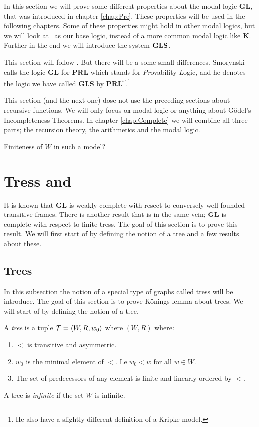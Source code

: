 \documentclass[../main.tex]{subfiles}
\begin{document}
In this section we will prove some different properties about the modal logic
\textbf{GL}, that was introduced in chapter \ref{chap:Pre}.
These properties will be used in the following chapters. Some of these properties might
hold in other modal logics, but we will look at \GL\ as our base logic,
instead of a more common modal logic like \textbf{K}.
Further in the end we will introduce the system $\text{\textbf{GLS}}$.

This section will follow \parencite{Smor1985}. But there will be a some small
differences. Smorynski calls the logic \textbf{GL} for \textbf{PRL} which
stands for \textit{Pr}ovability \textit{L}ogic, and he denotes the logic we
have called \textbf{GLS} by $\textbf{PRL}^\omega$.\footnote{He also have a
slightly different definition of a Kripke model.}

This section (and the next one) dose not use the preceding sections about recursive functions. We will only
focus on modal logic or anything about Gödel's Incompleteness Theorems. In
chapter \ref{chap:Complete} we will combine all three parts; the recursion
theory, the arithmetics and the modal logic.


Finiteness of $W$ in such a model?
\section{Tress and \GL}

It is known that \textbf{GL} is weakly complete with resect to conversely
well-founded transitive frames. There is another result that is in the same
vein; \textbf{GL} is complete with respect to finite tress. The goal of this
section is to prove this result. We will first start of by defining the notion
of a tree and a few results about these.

\subsection{Trees}
In this subsection the notion of a special type of graphs called tress will be
introduce. The goal of this section is to prove Könings lemma about trees. We
will start of by defining the notion of a tree.
\begin{defi}
	A \textit{tree} is a tuple $\mathcal{T}=\langle W,R,w_0\rangle$ where $(W,R)$ where:
	\begin{enumerate}
		\item $<$ is transitive and asymmetric.
		\item $w_0$ is the minimal element of $<$. I.e $w_0
			<w$ for all $w\in W$.
		\item The set of predecessors of any element is finite and
			linearly ordered by $<$.
	\end{enumerate}
	A tree is \textit{infinite} if the set $W$ is infinite.
\end{defi}
\end{document}

